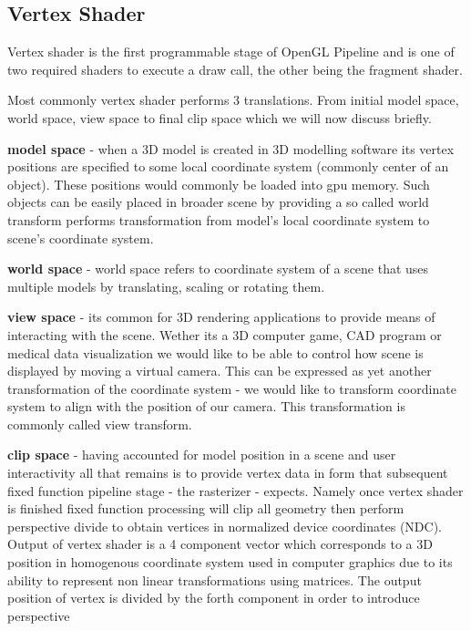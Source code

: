 \subsection{Vertex Shader}

Vertex shader is the first programmable stage of OpenGL Pipeline and is one of two required shaders to execute a draw call, the other being the fragment shader.

Most commonly vertex shader performs 3 translations. From initial model space, world space, view space to final clip space which we will now discuss briefly.

\textbf{model space} - when a 3D model is created in 3D modelling software its vertex positions are specified to some local coordinate system (commonly center of an object).
These positions would commonly be loaded into gpu memory. Such objects can be easily placed in broader scene by providing a so called world transform performs transformation from model's local coordinate system
to scene's coordinate system.

\textbf{world space} - world space refers to coordinate system of a scene that uses multiple models by translating, scaling or rotating them.

\textbf{view space} - its common for 3D rendering applications to provide means of interacting with the scene. Wether its a 3D computer game, CAD program or medical data visualization we would like to be able to 
control how scene is displayed by moving a virtual camera. This can be expressed as yet another transformation of the coordinate system - we would like to transform coordinate system to align with the position of our camera.
This transformation is commonly called view transform.

\textbf{clip space} - having accounted for model position in a scene and user interactivity all that remains is to provide vertex data in form that subsequent fixed function pipeline stage - the rasterizer - expects.
Namely once vertex shader is finished fixed function processing will clip all geometry then perform perspective divide to obtain vertices in normalized device coordinates (NDC).
Output of vertex shader is a 4 component vector which corresponds to a 3D position in homogenous coordinate system used in computer graphics due to its ability to represent non linear transformations using matrices.
The output position of vertex is divided by the forth component in order to introduce perspective 


